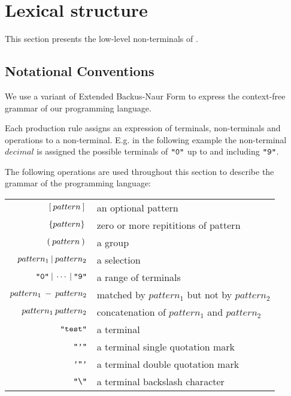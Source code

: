 \section{Lexical structure}
\label{sec:lexicalstructure}

This section presents the low-level non-terminals of \productname{}.

\subsection{Notational Conventions}
We use a variant of Extended Backus-Naur Form to express the context-free grammar of
our programming language.

Each production rule assigns an expression of terminals, non-terminals and operations
to a non-terminal. E.g. in the following example the non-terminal $decimal$ is assigned
the possible terminals of $\texttt{"0"}$ up to and including $\texttt{"9"}$.

\begin{ebnf}
\end{ebnf}

The following operations are used throughout this section to describe the grammar of the programming language:

\begin{center}
\begin{tabular}{r l}
  $[\: pattern \:] \:$ & an optional pattern \\
  $\{pattern\} \:$ & zero or more repititions of pattern \\
  $(\: pattern \:) \:$ & a group \\
  $pattern_1 \: | \: pattern_2$ & a selection \\
  $\texttt{"0"} \: | \: \cdots \: | \: \texttt{"9"}$ & a range of terminals \\
  $pattern_1 \: - \: pattern_2$ & matched by $pattern_1$ but not by $pattern_2$\\
  $pattern_1 \: pattern_2$ & concatenation of $pattern_1$ and $pattern_2$ \\
  $\texttt{"test"}$ & a terminal \\
  $\texttt{"'"}$ & a terminal single quotation mark \\
  $\texttt{'"'}$ & a terminal double quotation mark \\
  $\texttt{"\textbackslash"}$ & a terminal backslash character \\
\end{tabular}
\end{center}

